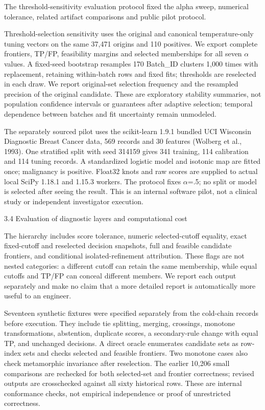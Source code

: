 \documentclass[11pt,a4paper]{article}
\begin{document}
The threshold-sensitivity evaluation protocol fixed the alpha sweep, numerical tolerance, related artifact comparisons and public pilot protocol.

Threshold-selection sensitivity uses the original and canonical temperature-only tuning vectors on the same 37,471 origins and 110 positives. We export complete frontiers, TP/FP, feasibility margins and selected memberships for all seven \ensuremath{\alpha} values. A fixed-seed bootstrap resamples 170 Batch\_ID clusters 1,000 times with replacement, retaining within-batch rows and fixed fits; thresholds are reselected in each draw. We report original-set selection frequency and the resampled precision of the original candidate. These are exploratory stability summaries, not population confidence intervals or guarantees after adaptive selection; temporal dependence between batches and fit uncertainty remain unmodeled.

The separately sourced pilot uses the scikit-learn 1.9.1 bundled UCI Wisconsin Diagnostic Breast Cancer data, 569 records and 30 features (Wolberg et al., 1993). One stratified split with seed 314159 gives 341 training, 114 calibration and 114 tuning records. A standardized logistic model and isotonic map are fitted once; malignancy is positive. Float32 knots and raw scores are supplied to actual local SciPy 1.18.1 and 1.15.3 workers. The protocol fixes \ensuremath{\alpha}=.5; no split or model is selected after seeing the result. This is an internal software pilot, not a clinical study or independent investigator execution.

3.4 Evaluation of diagnostic layers and computational cost

The hierarchy includes score tolerance, numeric selected-cutoff equality, exact fixed-cutoff and reselected decision snapshots, full and feasible candidate frontiers, and conditional isolated-refinement attribution. These flags are not nested categories: a different cutoff can retain the same membership, while equal cutoffs and TP/FP can conceal different members. We report each output separately and make no claim that a more detailed report is automatically more useful to an engineer.

Seventeen synthetic fixtures were specified separately from the cold-chain records before execution. They include tie splitting, merging, crossings, monotone transformations, abstention, duplicate scores, a secondary-rule change with equal TP, and unchanged decisions. A direct oracle enumerates candidate sets as row-index sets and checks selected and feasible frontiers. Two monotone cases also check metamorphic invariance after reselection. The earlier 10,206 small comparisons are rechecked for both selected-set and frontier correctness; revised outputs are crosschecked against all sixty historical rows. These are internal conformance checks, not empirical independence or proof of unrestricted correctness.
\end{document}
